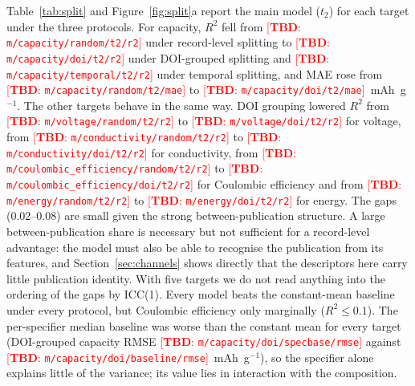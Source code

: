 \documentclass[journal=jcisd8,manuscript=article,layout=traditional]{achemso}
\newcommand{\TBD}[1]{\textcolor{red}{[\textbf{TBD}: \nolinkurl{#1}]}}
\begin{document}
Table~\ref{tab:split} and Figure~\ref{fig:split}a report the main model ($t_2$) for each target under the three protocols. For capacity, $R^2$ fell from \TBD{m/capacity/random/t2/r2} under record-level splitting to \TBD{m/capacity/doi/t2/r2} under DOI-grouped splitting and \TBD{m/capacity/temporal/t2/r2} under temporal splitting, and MAE rose from \TBD{m/capacity/random/t2/mae} to \TBD{m/capacity/doi/t2/mae}~mAh~g$^{-1}$. The other targets behave in the same way. DOI grouping lowered $R^2$ from \TBD{m/voltage/random/t2/r2} to \TBD{m/voltage/doi/t2/r2} for voltage, from \TBD{m/conductivity/random/t2/r2} to \TBD{m/conductivity/doi/t2/r2} for conductivity, from \TBD{m/coulombic_efficiency/random/t2/r2} to \TBD{m/coulombic_efficiency/doi/t2/r2} for Coulombic efficiency and from \TBD{m/energy/random/t2/r2} to \TBD{m/energy/doi/t2/r2} for energy. The gaps (0.02--0.08) are small given the strong between-publication structure. A large between-publication share is necessary but not sufficient for a record-level advantage: the model must also be able to recognise the publication from its features, and Section~\ref{sec:channels} shows directly that the descriptors here carry little publication identity. With five targets we do not read anything into the ordering of the gaps by ICC(1). Every model beats the constant-mean baseline under every protocol, but Coulombic efficiency only marginally ($R^2 \le 0.1$). The per-specifier median baseline was worse than the constant mean for every target (DOI-grouped capacity RMSE \TBD{m/capacity/doi/specbase/rmse} against \TBD{m/capacity/doi/baseline/rmse}~mAh~g$^{-1}$), so the specifier alone explains little of the variance; its value lies in interaction with the composition.
\end{document}
